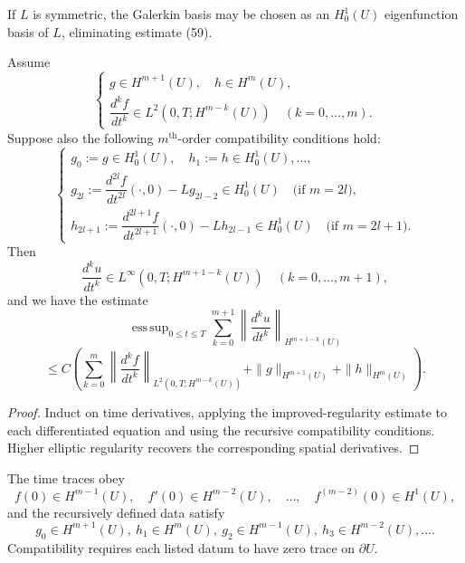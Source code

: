 \begin{remark}
\label{rem:hyperbolic-symmetric-eigenfunctions}

If $L$ is symmetric, the Galerkin basis may be chosen as an $H_0^1(U)$ eigenfunction basis of $L$, eliminating estimate (59).
\end{remark}

\begin{theorem}
\label{thm:hyperbolic-higher-regularity}

Assume
\[
\begin{cases}
g \in H^{m+1}(U), \quad h \in H^m(U), \\
\dfrac{d^k f}{dt^k} \in L^2(0, T; H^{m-k}(U)) \quad (k = 0, \ldots, m).
\end{cases}
\]
Suppose also the following $m^{\text{th}}$-order compatibility conditions hold:
\[
\begin{cases}
g_0 := g \in H^1_0(U), \quad h_1 := h \in H^1_0(U), \ldots, \\
g_{2l} := \dfrac{d^{2l}f}{dt^{2l}}(\cdot, 0) - Lg_{2l-2} \in H^1_0(U)
  \quad \text{(if } m = 2l\text{)}, \\
h_{2l+1} := \dfrac{d^{2l+1}f}{dt^{2l+1}}(\cdot, 0) - Lh_{2l-1} \in H^1_0(U)
  \quad \text{(if } m = 2l + 1\text{)}.
\end{cases}
\tag{62}
\]
Then
\[
\frac{d^k u}{dt^k} \in L^\infty(0, T; H^{m+1-k}(U)) \quad (k = 0, \ldots, m+1),
\tag{63}
\]
and we have the estimate
\[
\operatorname{ess\,sup}_{0 \le t \le T} \sum_{k=0}^{m+1} \left\| \frac{d^k u}{dt^k} \right\|_{H^{m+1-k}(U)}
\]
\[
\le C \left( \sum_{k=0}^{m} \left\| \frac{d^k f}{dt^k} \right\|_{L^2(0,T;H^{m-k}(U))} + \|g\|_{H^{m+1}(U)} + \|h\|_{H^m(U)} \right).
\tag{64}
\]
\end{theorem}

\begin{proof}
\sketch Induct on time derivatives, applying the improved-regularity estimate to each differentiated equation and using the recursive compatibility conditions. Higher elliptic regularity recovers the corresponding spatial derivatives.
\end{proof}

\begin{remark}
\label{rem:hyperbolic-higher-regularity-remark}

The time traces obey
\[
f(0)\in H^{m-1}(U),\quad f'(0)\in H^{m-2}(U),\quad\ldots,\quad f^{(m-2)}(0)\in H^1(U),
\tag{65}
\]
and the recursively defined data satisfy
\[
g_0\in H^{m+1}(U),\ h_1\in H^m(U),\ g_2\in H^{m-1}(U),\ h_3\in H^{m-2}(U),\ldots.
\tag{66}
\]
Compatibility requires each listed datum to have zero trace on $\partial U$.
\end{remark}

